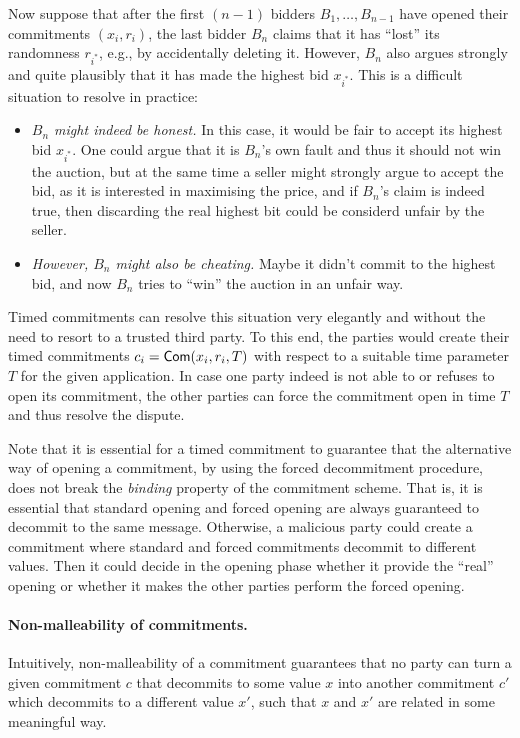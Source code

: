 Now suppose that after the first $(n-1)$ bidders $B_1, \ldots, B_{n-1}$ have opened their commitments $(x_i, r_i)$, the last bidder $B_n$ claims that it has ``lost'' its randomness $r_{i^*}$, e.g., by accidentally deleting it. However, $B_n$ also argues strongly and quite plausibly that it has made the highest bid $x_{i^*}$. This is a difficult situation to resolve in practice:
\begin{itemize}
	\item \emph{$B_n$ might indeed be honest.} In this case, it would be fair to accept its highest bid $x_{i^*}$. One could argue that it is $B_n$'s own fault and thus it should not win the auction, but at the same time a seller might strongly argue to accept the bid, as it is interested in maximising the price, and if $B_n$'s claim is indeed true, then discarding the real highest bit could be considerd unfair by the seller.
	\item \emph{However, $B_n$ might also be cheating.} Maybe it didn't commit to the highest bid, and now $B_n$ tries to ``win'' the auction in an unfair way.
\end{itemize}
Timed commitments can resolve this situation very elegantly and without the need to resort to a trusted third party. To this end, the parties would create their timed commitments $c_i = \mathsf{Com}(x_i,r_i, T)$ with respect to a suitable time parameter $T$ for the given application. In case one party indeed is not able to or refuses to open its commitment, the other parties can force the commitment open in time $T$ and thus resolve the dispute. 

Note that it is essential  for a timed commitment to guarantee that the alternative way of opening a commitment, by using the forced decommitment procedure, does not break the \emph{binding} property of the commitment scheme. That is, it is essential that standard opening and forced opening are always guaranteed to decommit to the same message. Otherwise, a malicious party could create a commitment where standard and forced commitments decommit to different values. Then it could decide in the opening phase whether it provide the ``real'' opening or whether it makes the other parties perform the forced opening.



\paragraph{Non-malleability of commitments.}
Intuitively, non-malleability of a commitment guarantees that no party can turn a given commitment $c$ that decommits to some value $x$ into another commitment $c'$ which decommits to a different value $x'$, such that $x$ and $x'$ are related in some meaningful way.

